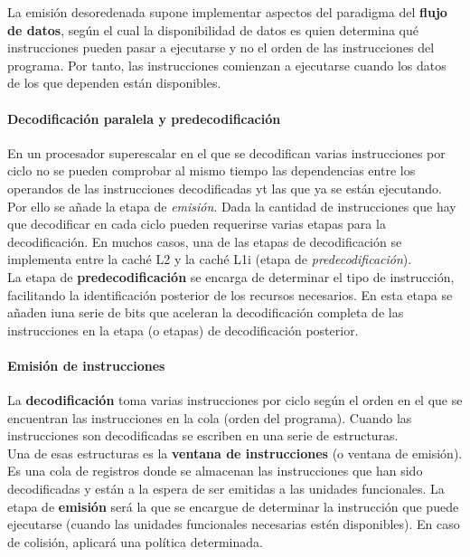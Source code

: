 \documentclass[12pt,spanish]{article}
\begin{document}
La emisión desoredenada supone implementar aspectos del paradigma del \textbf{flujo de datos}, según el cual la disponibilidad de datos es quien determina qué instrucciones pueden pasar a ejecutarse y no el orden de las instrucciones del programa. Por tanto, las instrucciones comienzan a ejecutarse cuando los datos de los que dependen están disponibles.\\

\paragraph{Decodificación paralela y predecodificación\\}

En un procesador superescalar en el que se decodifican varias instrucciones por ciclo no se pueden comprobar al mismo tiempo las dependencias entre los operandos de las instrucciones decodificadas yt las que ya se están ejecutando. Por ello se añade la etapa de \emph{emisión}. Dada la cantidad de instrucciones que hay que decodificar en cada ciclo pueden requerirse varias etapas para la decodificación. En muchos casos, una de las etapas de decodificación se implementa entre la caché L2 y la caché L1i (etapa de \emph{predecodificación}).\\

La etapa de \textbf{predecodificación} se encarga de determinar el tipo de instrucción, facilitando la identificación posterior de los recursos necesarios. En esta etapa se añaden iuna serie de bits que aceleran la decodificación completa de las instrucciones en la etapa (o etapas) de decodificación posterior.\\

\paragraph{Emisión de instrucciones\\}

La \textbf{decodificación} toma varias instrucciones por ciclo según el orden en el que se encuentran las instrucciones en la cola (orden del programa). Cuando las instrucciones son decodificadas se escriben en una serie de estructuras.\\

Una de esas estructuras es la \textbf{ventana de instrucciones} (o ventana de emisión). Es una cola de registros donde se almacenan las instrucciones que han sido decodificadas y están a la espera de ser emitidas a las unidades funcionales. La etapa de \textbf{emisión} será la que se encargue de determinar la instrucción que puede ejecutarse (cuando las unidades funcionales necesarias estén disponibles). En caso de colisión, aplicará una política determinada.\\
\end{document}
